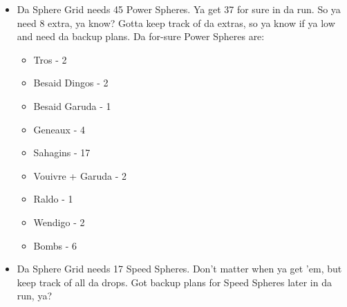 \begin{itemize}
    \item Da Sphere Grid needs 45 Power Spheres. Ya get 37 for sure in da run. So ya need 8 extra, ya know? Gotta keep track of da extras, so ya know if ya low and need da backup plans. Da for-sure Power Spheres are:
    \begin{itemize}
        \item Tros - 2
        \item Besaid Dingos - 2
        \item Besaid Garuda - 1
        \item Geneaux - 4
        \item Sahagins - 17
        \item Vouivre + Garuda - 2
        \item Raldo - 1
        \item Wendigo - 2
        \item Bombs - 6
    \end{itemize}
    \item Da Sphere Grid needs 17 Speed Spheres. Don't matter when ya get 'em, but keep track of all da drops. Got backup plans for Speed Spheres later in da run, ya?
\end{itemize}

